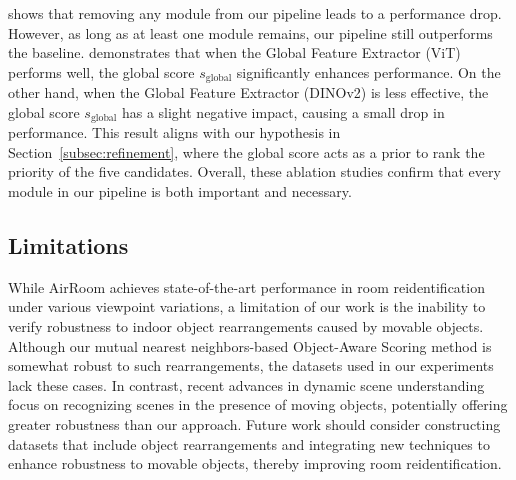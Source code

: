  shows that removing any module from our pipeline leads to a performance drop. However, as long as at least one module remains, our pipeline still outperforms the baseline.   demonstrates that when the Global Feature Extractor (ViT) performs well, the global score \(s_{\text{global}}\) significantly enhances performance. On the other hand, when the Global Feature Extractor (DINOv2) is less effective, the global score \(s_{\text{global}}\) has a slight negative impact, causing a small drop in performance. This result aligns with our hypothesis in Section~\ref{subsec:refinement}, where the global score acts as a prior to rank the priority of the five candidates. Overall, these ablation studies confirm that every module in our pipeline is both important and necessary.

\subsection{Limitations}

While AirRoom achieves state-of-the-art performance in room reidentification under various viewpoint variations, a limitation of our work is the inability to verify robustness to indoor object rearrangements caused by movable objects. Although our mutual nearest neighbors-based Object-Aware Scoring method is somewhat robust to such rearrangements, the datasets used in our experiments lack these cases. In contrast, recent advances in dynamic scene understanding \cite{zhao2024dynamicsceneunderstandingobjectcentric} focus on recognizing scenes in the presence of moving objects, potentially offering greater robustness than our approach. Future work should consider constructing datasets that include object rearrangements and integrating new techniques to enhance robustness to movable objects, thereby improving room reidentification.